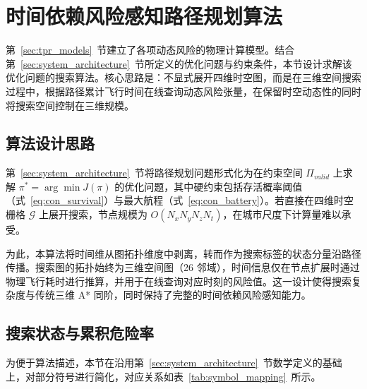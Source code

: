 
\section{时间依赖风险感知路径规划算法}
\label{sec:algorithm}

第~\ref{sec:tpr_models}~节建立了各项动态风险的物理计算模型。结合第~\ref{sec:system_architecture}~节所定义的优化问题与约束条件，本节设计求解该优化问题的搜索算法。核心思路是：不显式展开四维时空图，而是在三维空间搜索过程中，根据路径累计飞行时间在线查询动态风险张量，在保留时空动态性的同时将搜索空间控制在三维规模。

\subsection{算法设计思路}
\label{subsec:problem_formulation}

第~\ref{sec:system_architecture}~节将路径规划问题形式化为在约束空间 $\Pi_{valid}$ 上求解 $\pi^* = \arg\min J(\pi)$ 的优化问题，其中硬约束包括存活概率阈值（式~\ref{eq:con_survival}）与最大航程（式~\ref{eq:con_battery}）。若直接在四维时空栅格 $\mathcal{G}$ 上展开搜索，节点规模为 $O(N_x N_y N_z N_t)$，在城市尺度下计算量难以承受。

为此，本算法将时间维从图拓扑维度中剥离，转而作为搜索标签的状态分量沿路径传播。搜索图的拓扑始终为三维空间图（26 邻域），时间信息仅在节点扩展时通过物理飞行耗时进行推算，并用于在线查询对应时刻的风险值。这一设计使得搜索复杂度与传统三维 A* 同阶，同时保持了完整的时间依赖风险感知能力。

\subsection{搜索状态与累积危险率}
\label{subsec:state_definition}

为便于算法描述，本节在沿用第~\ref{sec:system_architecture}~节数学定义的基础上，对部分符号进行简化，对应关系如表~\ref{tab:symbol_mapping}~所示。

